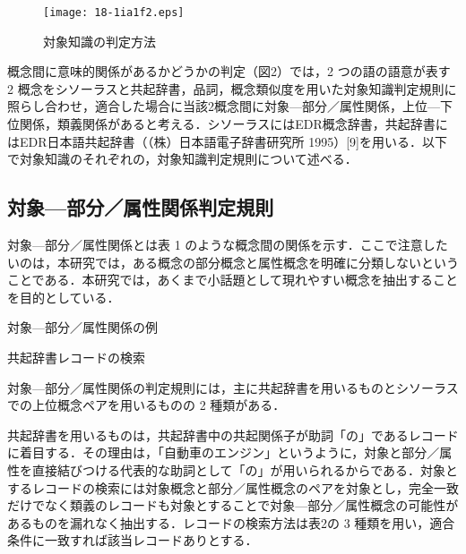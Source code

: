\documentclass[japanese]{jnlp_1.4}
\begin{document}
\begin{figure}[t]
\begin{center}
\texttt{[image: 18-1ia1f2.eps]}
\end{center}
\caption{対象知識の判定方法}
\end{figure}

概念間に意味的関係があるかどうかの判定（図2）では，2 つの語の語意が表す 2 概念をシソーラスと共起辞書，品詞，概念類似度を用いた対象知識判定規則に照らし合わせ，適合した場合に当該2概念間に対象—部分／属性関係，上位—下位関係，類義関係があると考える．シソーラスにはEDR概念辞書，共起辞書にはEDR日本語共起辞書（（株）日本語電子辞書研究所 1995）[9]を用いる．以下で対象知識のそれぞれの，対象知識判定規則について述べる．




\subsection{対象—部分／属性関係判定規則}
\label{sec:mylabel4}

対象—部分／属性関係とは表 1 のような概念間の関係を示す．ここで注意したいのは，本研究では，ある概念の部分概念と属性概念を明確に分類しないということである．本研究では，あくまで小話題として現れやすい概念を抽出することを目的としている．


\begin{table}[t]
\caption{対象—部分／属性関係の例}

\end{table}
\begin{table}[t]
\caption{共起辞書レコードの検索}

\end{table}



対象—部分／属性関係の判定規則には，主に共起辞書を用いるものとシソーラスでの上位概念ペアを用いるものの 2 種類がある．

共起辞書を用いるものは，共起辞書中の共起関係子が助詞「の」であるレコードに着目する．その理由は，「自動車のエンジン」というように，対象と部分／属性を直接結びつける代表的な助詞として「の」が用いられるからである．対象とするレコードの検索には対象概念と部分／属性概念のペアを対象とし，完全一致だけでなく類義のレコードも対象とすることで対象—部分／属性概念の可能性があるものを漏れなく抽出する．レコードの検索方法は表2の 3 種類を用い，適合条件に一致すれば該当レコードありとする．
\end{document}
